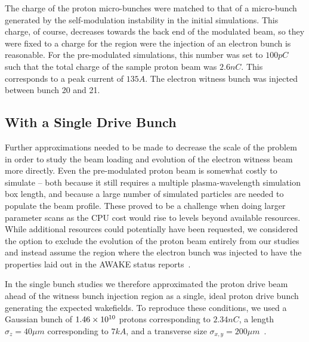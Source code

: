 The charge of the proton micro-bunches were matched to that of a micro-bunch generated by the self-modulation instability in the initial simulations.
This charge, of course, decreases towards the back end of the modulated beam, so they were fixed to a charge for the region were the injection of an electron bunch is reasonable.
For the pre-modulated simulations, this number was set to $100\unit{pC}$ such that the total charge of the sample proton beam was $2.6\unit{nC}$.
This corresponds to a peak current of $135\unit{A}$.
The electron witness bunch was injected between bunch 20 and 21.



\subsection{With a Single Drive Bunch}
\label{Sim:PBSingle}

Further approximations needed to be made to decrease the scale of the problem in order to study the beam loading and evolution of the electron witness beam more directly.
Even the pre-modulated proton beam is somewhat costly to simulate -- both because it still requires a multiple plasma-wavelength simulation box length, and because a large number of simulated particles are needed to populate the beam profile.
These proved to be a challenge when doing larger parameter scans as the CPU cost would rise to levels beyond available resources.
While additional resources could potentially have been requested, we considered the option to exclude the evolution of the proton beam entirely from our studies and instead assume the region where the electron bunch was injected to have the properties laid out in the AWAKE status reports~\cite{awake_collaboration:2016}.

In the single bunch studies we therefore approximated the proton drive beam ahead of the witness bunch injection region as a single, ideal proton drive bunch generating the expected wakefields.
To reproduce these conditions, we used a Gaussian bunch of $1.46\times 10^{10}$ protons corresponding to $2.34\unit{nC}$, a length $\sigma_{z} = 40\unit{\mu m}$ corresponding to $7\unit{kA}$, and a transverse size $\sigma_{x,y}=200\unit{\mu m}$~\cite{berglyd_olsen:2018}.

